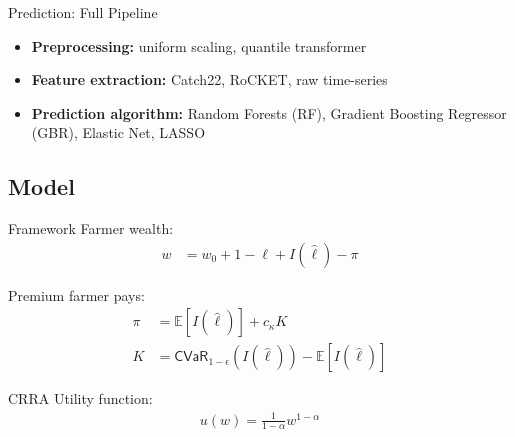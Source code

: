 \documentclass{beamer}
\begin{document}
\begin{frame}{Prediction: Full Pipeline}
    \begin{itemize}
        \setlength\itemsep{2em} 
        \item \textbf{Preprocessing:} uniform scaling, quantile transformer
        \item \textbf{Feature extraction:} Catch22, RoCKET, raw time-series
        \item \textbf{Prediction algorithm:} Random Forests (RF), Gradient Boosting Regressor (GBR), Elastic Net, LASSO
    \end{itemize}
    
\end{frame}

\subsection{Model}



\begin{frame}{Framework}
    Farmer wealth:
    \begin{align*}
        w &= w_0 + 1 - \ell + I(\hat{\ell}) - \pi
    \end{align*}

    Premium \footnotemark farmer pays: 
    \begin{align*}
        \pi &= \mathbb{E}[I(\hat{\ell})] + c_{\kappa}K \\
        K &= \textsf{CVaR}_{1-\epsilon} \left ( I(\hat{\ell})  \right ) - \mathbb{E}[I(\hat{\ell})] 
    \end{align*}

    CRRA Utility function: 
    \begin{align*}
        u(w) = \frac{1}{1-\alpha} w^{1-\alpha}
    \end{align*}

\end{frame}
\end{document}
